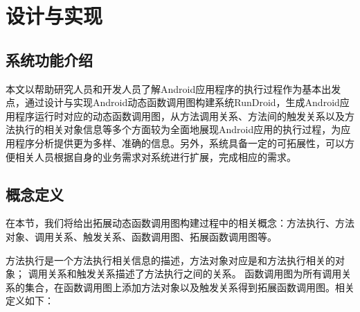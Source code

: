 \chapter{设计与实现 }
\label{ch3}

\section{系统功能介绍}
本文以帮助研究人员和开发人员了解Android应用程序的执行过程作为基本出发点，通过设计与实现Android动态函数调用图构建系统RunDroid，生成Android应用程序运行时对应的动态函数调用图，从方法调用关系、方法间的触发关系以及方法执行的相关对象信息等多个方面较为全面地展现Android应用的执行过程，为应用程序分析提供更为多样、准确的信息。另外，系统具备一定的可拓展性，可以方便相关人员根据自身的业务需求对系统进行扩展，完成相应的需求。

\section{概念定义}

在本节，我们将给出拓展动态函数调用图构建过程中的相关概念：方法执行、方法对象、调用关系、触发关系、函数调用图、拓展函数调用图等。

方法执行是一个方法执行相关信息的描述，方法对象对应是和方法执行相关的对象；
调用关系和触发关系描述了方法执行之间的关系。
函数调用图为所有调用关系的集合，在函数调用图上添加方法对象以及触发关系得到拓展函数调用图。相关定义如下：





